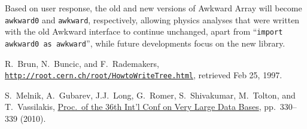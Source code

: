 \documentclass{webofc}
\begin{document}
Based on user response, the old and new versions of Awkward Array will become \texttt{awkward0} and \texttt{awkward}, respectively, allowing physics analyses that were written with the old Awkward interface to continue unchanged, apart from ``\texttt{import awkward0 as awkward}'', while future developments focus on the new library.



% 
%
\begin{thebibliography}{}

R.\ Brun, N.\ Buncic, and F.\ Rademakers, \\ \href{https://web.archive.org/web/19970225083621/http://root.cern.ch/root/HowtoWriteTree.html}{\tt http://root.cern.ch/root/HowtoWriteTree.html}, retrieved Feb 25, 1997.

S.\ Melnik, A.\ Gubarev, J.J.\ Long, G.\ Romer, S.\ Shivakumar, M.\ Tolton, and T.\ Vassilakis, \href{http://www.vldb2010.org/accept.htm}{Proc.\ of the 36th Int'l Conf on Very Large Data Bases}, pp.\ 330--339 (2010).

\end{thebibliography}
\end{document}
